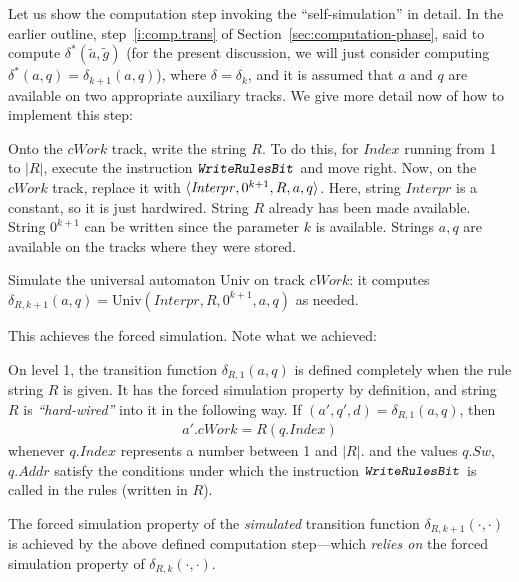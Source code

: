 \documentclass[12pt]{memoir}
\newcommand{\fld}[1]{\ensuremath{\textit{#1}}}
\newcommand{\rul}[1]{\ensuremath{\texttt{\slshape #1\/}}}
\newcommand{\Addr}{\fld{Addr}}
\newcommand{\Index}{\fld{Index}}
\newcommand{\Sweep}{\fld{Sw}}
\newcommand{\cWork}{\fld{cWork}}
\newcommand{\Interpr}{\mathit{Interpr}}
\newcommand{\Un}{\mathrm{Univ}}
\newcommand{\WriteRulesBit}{\rul{WriteRulesBit}}
\begin{document}
Let us show the computation step invoking the ``self-simulation'' in detail.
In the earlier outline, step~\ref{i:comp.trans} of Section~\ref{sec:computation-phase},
said to compute \( \delta^{*}(\tilde a, \tilde g) \)
(for the present discussion, we will just consider computing 
\( \delta^{*}(a,q)=\delta_{k+1}(a,q) \)), where \( \delta=\delta_{k} \),
and it is assumed that \( a \) and \( q \) are available on two appropriate
auxiliary tracks.
We give more detail now of how to implement this step:

\begin{enumerate}[1.]
\item Onto the \( \cWork \) track, write the string \( R \).
To do this, for \( \Index \) running from 1 to \( |R| \), 
execute the instruction \( \WriteRulesBit \) and move right.
Now, on the \( \cWork  \) track, replace it with \( \ang{\Interpr,0^{k+1},R,a,q} \).
Here, string \( \Interpr \) is a constant, so it is just hardwired.
String \( R \) already has been made available.
String \( 0^{k+1} \) can be written since the parameter \( k \) is available.
Strings \( a,q \) are available on the tracks where they were stored.
\begin{sloppypar}
 \item Simulate the universal automaton \( \Un \) on track \( \cWork \):
   it computes \( \delta_{R,k+1}(a,q)=\Un(\Interpr,R,0^{k+1}, a,q) \)
as needed.  
\end{sloppypar}
\end{enumerate}

This achieves the forced simulation.
Note what we achieved:

\begin{itemize}
  \begin{sloppypar}
\item On level 1, the transition function \( \delta_{R,1}(a,q) \) is defined completely
when the rule string \( R \) is given.
It has the forced simulation property by definition, and
string \( R \) is \emph{``hard-wired''} into it in the following way.
If \( (a',q',d)=\delta_{R,1}(a,q) \), then
\begin{align*}
  a'.\cWork=R(q.\Index)
\end{align*}
whenever \( q.\Index \) represents a number between 1 and \( |R| \).
and the values \( q.\Sweep \), \( q.\Addr \) satisfy the conditions
under which the instruction \( \WriteRulesBit \) is 
called in the rules (written in \( R \)).
      \end{sloppypar}

      \begin{sloppypar}
\item The forced simulation property of the \emph{simulated}
transition function \( \delta_{R,k+1}(\cdot,\cdot) \) is 
achieved by the above defined computation 
step---which \emph{relies on} the forced simulation property of \( \delta_{R,k}(\cdot,\cdot) \).
              \end{sloppypar}
\end{itemize}
\end{document}
